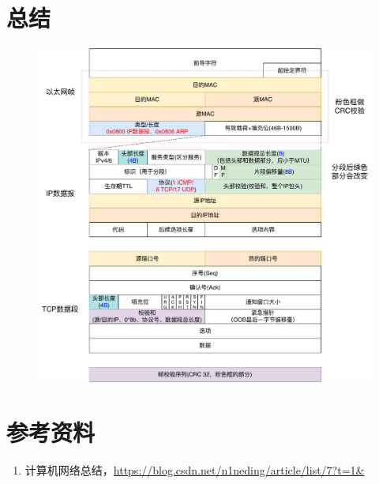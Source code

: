 
\section{总结}
\begin{figure}[H]
    \centering
    \includegraphics[width=0.9\linewidth]{fig/network-headers.pdf}
\end{figure}

\section{参考资料}
\begin{enumerate}
\item 计算机网络总结，\url{https://blog.csdn.net/n1neding/article/list/7?t=1&}
\end{enumerate}